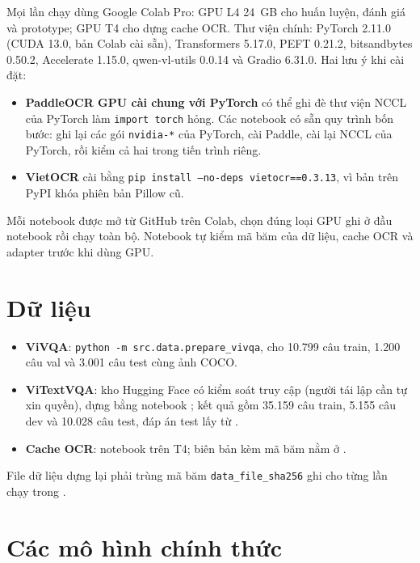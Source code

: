 Mọi lần chạy dùng Google Colab Pro: GPU L4 24~GB cho huấn luyện, đánh giá và
prototype; GPU T4 cho dựng cache OCR. Thư viện chính: PyTorch 2.11.0 (CUDA 13.0,
bản Colab cài sẵn), Transformers 5.17.0, PEFT 0.21.2, bitsandbytes 0.50.2,
Accelerate 1.15.0, qwen-vl-utils 0.0.14 và Gradio 6.31.0. Hai lưu ý khi cài đặt:

\begin{itemize}
  \item \textbf{PaddleOCR GPU cài chung với PyTorch} có thể ghi đè thư viện NCCL
  của PyTorch làm \texttt{import torch} hỏng. Các notebook có sẵn quy trình bốn
  bước: ghi lại các gói \texttt{nvidia-*} của PyTorch, cài Paddle, cài lại NCCL
  của PyTorch, rồi kiểm cả hai trong tiến trình riêng.
  \item \textbf{VietOCR} cài bằng \texttt{pip install --no-deps vietocr==0.3.13},
  vì bản trên PyPI khóa phiên bản Pillow cũ.
\end{itemize}

Mỗi notebook được mở từ GitHub trên Colab, chọn đúng loại GPU ghi ở đầu notebook
rồi chạy toàn bộ. Notebook tự kiểm mã băm của dữ liệu, cache OCR và adapter trước
khi dùng GPU.

\section{Dữ liệu}

\begin{itemize}
  \item \textbf{ViVQA}: \texttt{python -m src.data.prepare\_vivqa}, cho 10.799 câu
  train, 1.200 câu val và 3.001 câu test cùng ảnh COCO.
  \item \textbf{ViTextVQA}: kho Hugging Face có kiểm soát truy cập
   (người tái lập cần tự xin quyền), dựng bằng
  notebook ; kết quả gồm 35.159 câu train,
  5.155 câu dev và 10.028 câu test, đáp án test lấy từ
  .
  \item \textbf{Cache OCR}: notebook  trên T4;
  biên bản kèm mã băm nằm ở
  .
\end{itemize}

File dữ liệu dựng lại phải trùng mã băm \texttt{data\_file\_sha256} ghi cho từng
lần chạy trong .

\section{Các mô hình chính thức}

